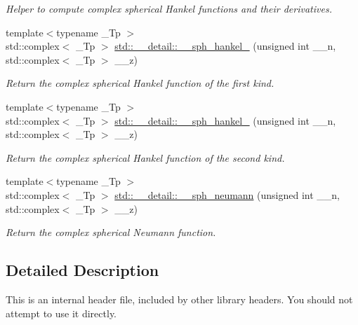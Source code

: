 \begin{DoxyCompactItemize}
\begin{DoxyCompactList}\small\item\em Helper to compute complex spherical Hankel functions and their derivatives. \end{DoxyCompactList}\item 
{\footnotesize template$<$typename \+\_\+\+Tp $>$ }\\std\+::complex$<$ \+\_\+\+Tp $>$ \hyperlink{namespacestd_1_1____detail_a887838c407a7cdb7c4ee145a18d2aa12}{std\+::\+\_\+\+\_\+detail\+::\+\_\+\+\_\+sph\+\_\+hankel\+\_} (unsigned int \+\_\+\+\_\+n, std\+::complex$<$ \+\_\+\+Tp $>$ \+\_\+\+\_\+z)
\begin{DoxyCompactList}\small\item\em Return the complex spherical Hankel function of the first kind. \end{DoxyCompactList}\item 
{\footnotesize template$<$typename \+\_\+\+Tp $>$ }\\std\+::complex$<$ \+\_\+\+Tp $>$ \hyperlink{namespacestd_1_1____detail_ade83ff0131b8880428cbd58028d89bc5}{std\+::\+\_\+\+\_\+detail\+::\+\_\+\+\_\+sph\+\_\+hankel\+\_} (unsigned int \+\_\+\+\_\+n, std\+::complex$<$ \+\_\+\+Tp $>$ \+\_\+\+\_\+z)
\begin{DoxyCompactList}\small\item\em Return the complex spherical Hankel function of the second kind. \end{DoxyCompactList}\item 
{\footnotesize template$<$typename \+\_\+\+Tp $>$ }\\std\+::complex$<$ \+\_\+\+Tp $>$ \hyperlink{namespacestd_1_1____detail_ac72e28d4d5fb8b0ffa033b9a47b67a8e}{std\+::\+\_\+\+\_\+detail\+::\+\_\+\+\_\+sph\+\_\+neumann} (unsigned int \+\_\+\+\_\+n, std\+::complex$<$ \+\_\+\+Tp $>$ \+\_\+\+\_\+z)
\begin{DoxyCompactList}\small\item\em Return the complex spherical Neumann function. \end{DoxyCompactList}\end{DoxyCompactItemize}


\subsection{Detailed Description}
This is an internal header file, included by other library headers. You should not attempt to use it directly. 

